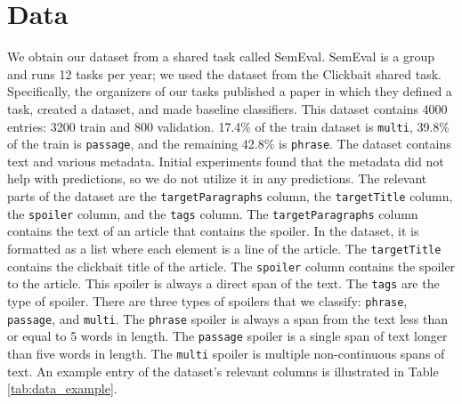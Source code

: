 \documentclass[12pt]{article}
\begin{document}
\section{Data}
We obtain our dataset from a shared task called SemEval. SemEval is a group and runs 12 tasks per year; we used the dataset from the Clickbait shared task. Specifically, the organizers of our tasks published a paper in which they defined a task, created a dataset, and made baseline classifiers. \cite{hagen_frobe_jurk_potthast_2022} This dataset contains 4000 entries: 3200 train and 800 validation. 17.4\% of the train dataset is \verb|multi|, 39.8\% of the train is \verb|passage|, and the remaining 42.8\% is \verb|phrase|. The dataset contains text and various metadata. Initial experiments found that the metadata did not help with predictions, so we do not utilize it in any predictions. The relevant parts of the dataset are the \texttt{targetParagraphs} column, the \texttt{targetTitle} column, the \texttt{spoiler} column, and the \texttt{tags} column. The \texttt{targetParagraphs} column contains the text of an article that contains the spoiler. In the dataset, it is formatted as a list where each element is a line of the article. The \texttt{targetTitle} contains the clickbait title of the article. The \texttt{spoiler} column contains the spoiler to the article. This spoiler is always a direct span of the text. The \texttt{tags} are the type of spoiler. There are three types of spoilers that we classify: \texttt{phrase}, \texttt{passage}, and \texttt{multi}. The \texttt{phrase} spoiler is always a span from the text less than or equal to 5 words in length. The \texttt{passage} spoiler is a single span of text longer than five words in length. The \texttt{multi} spoiler is multiple non-continuous spans of text. An example entry of the dataset's relevant columns is illustrated in Table \ref{tab:data_example}.


\end{document}
